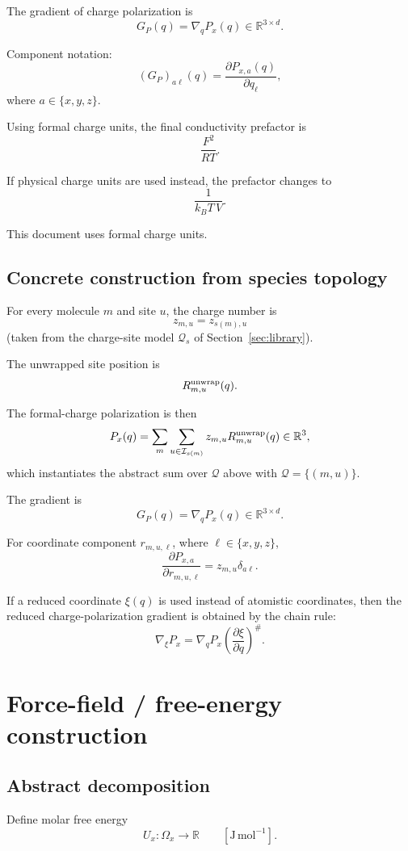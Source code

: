 \documentclass[11pt]{article}
\newcommand{\R}{\mathbb R}
\begin{document}
The gradient of charge polarization is
\[
G_P(q)=\nabla_q P_x(q)\in\R^{3\times d}.
\]

Component notation:
\[
(G_P)_{a\ell}(q)
=
\frac{\partial P_{x,a}(q)}{\partial q_\ell},
\]
where \(a\in\{x,y,z\}\).

Using formal charge units, the final conductivity prefactor is
\[
\frac{F^2}{RT}.
\]

If physical charge units are used instead, the prefactor changes to
\[
\frac{1}{k_BT\,V}.
\]

This document uses formal charge units.

\subsection{Concrete construction from species topology}

For every molecule \(m\) and site \(u\), the charge number is
\[
z_{m,u}=z_{s(m),u}
\]
(taken from the charge-site model \(\mathcal Q_{s}\) of Section~\ref{sec:library}).

The unwrapped site position is
\[
R_{m,u}^{\rm unwrap}(q).
\]

The formal-charge polarization is then
\[
P_x(q)
=
\sum_{m}\sum_{u\in\mathcal I_{s(m)}}
z_{m,u}R_{m,u}^{\rm unwrap}(q)
\in\mathbb R^3,
\]
which instantiates the abstract sum over \(\mathcal Q\) above with
\(\mathcal Q=\{(m,u)\}\).

The gradient is
\[
G_P(q)=\nabla_qP_x(q)\in\R^{3\times d}.
\]

For coordinate component \(r_{m,u,\ell}\), where \(\ell\in\{x,y,z\}\),
\[
\frac{\partial P_{x,a}}{\partial r_{m,u,\ell}}
=
z_{m,u}\delta_{a\ell}.
\]

If a reduced coordinate \(\xi(q)\) is used instead of atomistic coordinates,
then the reduced charge-polarization gradient is obtained by the chain rule:
\[
\nabla_{\xi}P_x
=
\nabla_qP_x
\left(\frac{\partial \xi}{\partial q}\right)^{\#}.
\]

\section{Force-field / free-energy construction}
\label{sec:forcefield}

\subsection{Abstract decomposition}

Define molar free energy
\[
U_x:\Omega_x\to\R
\qquad [\mathrm{J\,mol^{-1}}].
\]
\end{document}
